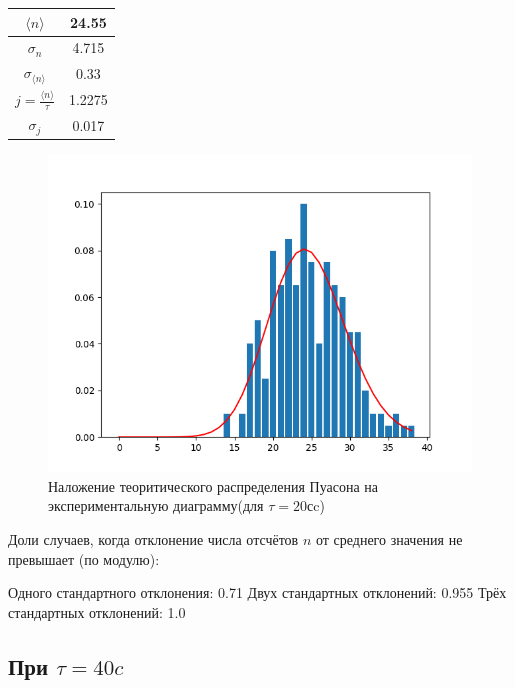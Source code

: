 \documentclass[a4paper, 12pt]{article}
\begin{document}
\begin{table}[!h]
\begin{center}
\begin{tabular}{|c|c|}
\hline
$\langle n\rangle$ & 24.55 \\ \hline
$\sigma_{n}$ & 4.715 \\ \hline
$\sigma_{\langle n\rangle}$ & 0.33 \\ \hline
$j=\frac{\langle n\rangle}{\tau}$ & 1.2275 \\ \hline
$\sigma_{j}$ & 0.017 \\ \hline
\end{tabular}
\end{center}
\end{table}

\begin{figure}[h!]
    \centering
    \includegraphics[width=1\textwidth]{20.png}
    \caption{Наложение теоритического распределения Пуасона на экспериментальную диаграмму(для $\tau = 20с$c)}
    \label{fig:my_label}
\end{figure}

Доли случаев, когда отклонение числа отсчётов $n$ от среднего значения не превышает (по модулю):

Одного стандартного отклонения: 0.71
Двух стандартных отклонений: 0.955
Трёх стандартных отклонений: 1.0

\clearpage

\subsection*{При $\tau=40 c$}
\end{document}
